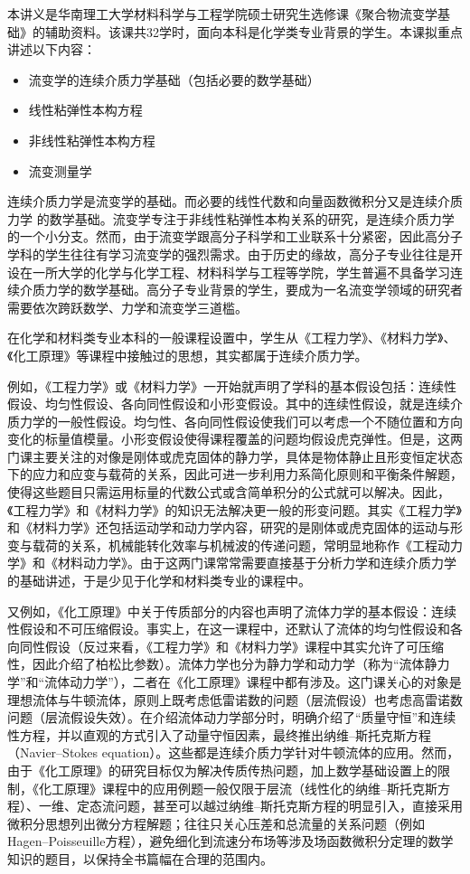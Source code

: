 \documentclass[main.tex]{subfiles}
\begin{document}
本讲义是华南理工大学材料科学与工程学院硕士研究生选修课《聚合物流变学基础》的辅助资料。该课共32学时，面向本科是化学类专业背景的学生。本课拟重点讲述以下内容：

\begin{itemize}
    \item 流变学的连续介质力学基础（包括必要的数学基础）
    \item 线性粘弹性本构方程
    \item 非线性粘弹性本构方程
    \item 流变测量学
\end{itemize}

连续介质力学是流变学的基础。而必要的线性代数和向量函数微积分又是连续介质力学 的数学基础。流变学专注于非线性粘弹性本构关系的研究，是连续介质力学的一个小分支。然而，由于流变学跟高分子科学和工业联系十分紧密，因此高分子学科的学生往往有学习流变学的强烈需求。由于历史的缘故，高分子专业往往是开设在一所大学的化学与化学工程、材料科学与工程等学院，学生普遍不具备学习连续介质力学的数学基础。高分子专业背景的学生，要成为一名流变学领域的研究者需要依次跨跃数学、力学和流变学三道槛。

在化学和材料类专业本科的一般课程设置中，学生从《工程力学》、《材料力学》、《化工原理》等课程中接触过的思想，其实都属于连续介质力学。

例如，《工程力学》或《材料力学》一开始就声明了学科的基本假设包括：连续性假设、均匀性假设、各向同性假设和小形变假设。其中的连续性假设，就是连续介质力学的一般性假设。均匀性、各向同性假设使我们可以考虑一个不随位置和方向变化的标量值模量。小形变假设使得课程覆盖的问题均假设虎克弹性。但是，这两门课主要关注的对像是刚体或虎克固体的静力学，具体是物体静止且形变恒定状态下的应力和应变与载荷的关系，因此可进一步利用力系简化原则和平衡条件解题，使得这些题目只需运用标量的代数公式或含简单积分的公式就可以解决。因此，《工程力学》和《材料力学》的知识无法解决更一般的形变问题。其实《工程力学》和《材料力学》还包括运动学和动力学内容，研究的是刚体或虎克固体的运动与形变与载荷的关系，机械能转化效率与机械波的传递问题，常明显地称作《工程动力学》和《材料动力学》。由于这两门课常常需要直接基于分析力学和连续介质力学的基础讲述，于是少见于化学和材料类专业的课程中。

又例如，《化工原理》中关于传质部分的内容也声明了流体力学的基本假设：连续性假设和不可压缩假设。事实上，在这一课程中，还默认了流体的均匀性假设和各向同性假设（反过来看，《工程力学》和《材料力学》课程中其实允许了可压缩性，因此介绍了柏松比参数）。流体力学也分为静力学和动力学（称为“流体静力学”和“流体动力学”），二者在《化工原理》课程中都有涉及。这门课关心的对象是理想流体与牛顿流体，原则上既考虑低雷诺数的问题（层流假设）也考虑高雷诺数问题（层流假设失效）。在介绍流体动力学部分时，明确介绍了“质量守恒”和连续性方程，并以直观的方式引入了动量守恒因素，最终推出纳维--斯托克斯方程（Navier--Stokes equation）。这些都是连续介质力学针对牛顿流体的应用。然而，由于《化工原理》的研究目标仅为解决传质传热问题，加上数学基础设置上的限制，《化工原理》课程中的应用例题一般仅限于层流（线性化的纳维--斯托克斯方程）、一维、定态流问题，甚至可以越过纳维--斯托克斯方程的明显引入，直接采用微积分思想列出微分方程解题；往往只关心压差和总流量的关系问题（例如Hagen--Poisseuille方程），避免细化到流速分布场等涉及场函数微积分定理的数学知识的题目，以保持全书篇幅在合理的范围内。
\end{document}
